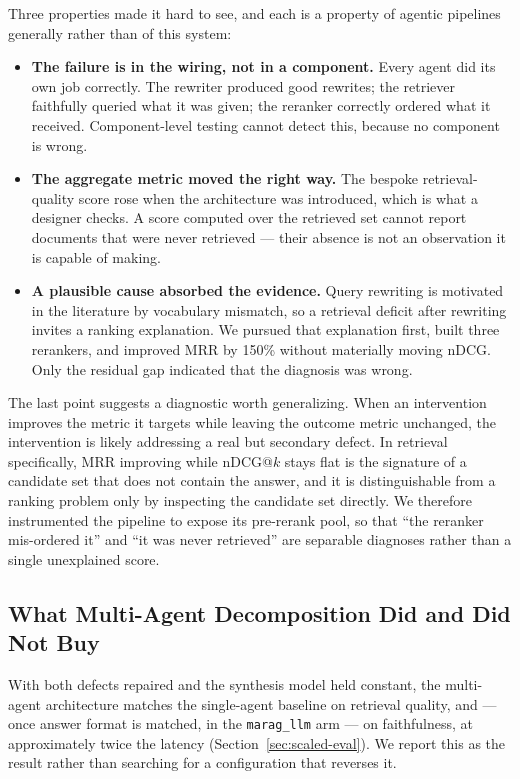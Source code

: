 \documentclass[acmsmall,review,anonymous,screen]{acmart}
\begin{document}
Three properties made it hard to see, and each is a property of agentic
pipelines generally rather than of this system:

\begin{itemize}
  \item \textbf{The failure is in the wiring, not in a component.} Every agent
  did its own job correctly. The rewriter produced good rewrites; the retriever
  faithfully queried what it was given; the reranker correctly ordered what it
  received. Component-level testing cannot detect this, because no component is
  wrong.

  \item \textbf{The aggregate metric moved the right way.} The bespoke
  retrieval-quality score rose when the architecture was introduced, which is
  what a designer checks. A score computed over the retrieved set cannot report
  documents that were never retrieved --- their absence is not an observation it
  is capable of making.

  \item \textbf{A plausible cause absorbed the evidence.} Query rewriting is
  motivated in the literature by vocabulary mismatch, so a retrieval deficit
  after rewriting invites a ranking explanation. We pursued that explanation
  first, built three rerankers, and improved MRR by 150\% without materially
  moving nDCG. Only the residual gap indicated that the diagnosis was wrong.
\end{itemize}

The last point suggests a diagnostic worth generalizing. When an intervention
improves the metric it targets while leaving the outcome metric unchanged, the
intervention is likely addressing a real but secondary defect. In retrieval
specifically, MRR improving while nDCG@$k$ stays flat is the
signature of a candidate set that does not contain the answer, and it is
distinguishable from a ranking problem only by inspecting the candidate set
directly. We therefore instrumented the pipeline to expose its pre-rerank pool,
so that ``the reranker mis-ordered it'' and ``it was never retrieved'' are
separable diagnoses rather than a single unexplained score.

\subsection{What Multi-Agent Decomposition Did and Did Not Buy}
\label{sec:decomposition}

With both defects repaired and the synthesis model held constant, the
multi-agent architecture matches the single-agent baseline on retrieval quality,
and --- once answer format is matched, in the \texttt{marag\_llm} arm --- on
faithfulness, at approximately twice the latency
(Section~\ref{sec:scaled-eval}). We report this as the result rather than
searching for a configuration that reverses it.
\end{document}
